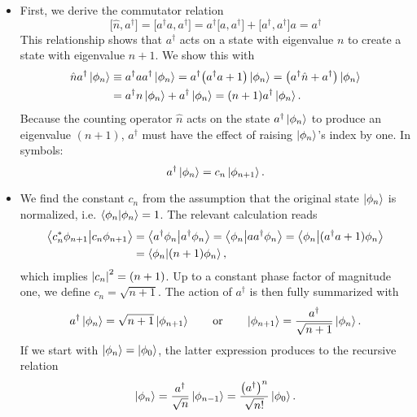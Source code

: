 \documentclass[11pt, a4paper]{article}
\newcommand{\eqtext}[1]{\qquad \text{#1} \qquad}
\newcommand{\bbraket}[2]{\big \langle {#1} \big | {#2} \big \rangle}  %
\renewcommand{\k}[1]{\ket{#1}}
\begin{document}
\begin{itemize}
	\item First, we derive the commutator relation
	\begin{equation*}
		\big[\hat{n}, a^{\dagger}\big] = \big[a^{\dagger} a, a^{\dagger}\big] = a^{\dagger}\big[a, a^{\dagger}\big] + \big[a^{\dagger}, a^{\dagger}\big]a = a^{\dagger}
	\end{equation*}
	This relationship shows that $ a^{\dagger} $ acts on a state with eigenvalue $ n $ to create a state with eigenvalue $ n + 1 $. We show this with
	\begin{align*}
		\hat{n}a^{\dagger}\k{\phi_{n}} &\equiv a^{\dagger} a a^{\dagger}\k{\phi_{n}} = a^{\dagger}\big(a^{\dagger}a + 1\big)\ket{\phi_{n}} = \big(a^{\dagger}\hat{n} + a^{\dagger}\big)\k{\phi_{n}}\\
		& = a^{\dagger}n \k{\phi_{n}} + a^{\dagger}\k{\phi_{n}} = (n + 1)a^{\dagger}\ket{\phi_{n}}.
	\end{align*}
	Because the counting operator $ \hat{n} $ acts on the state $ a^{\dagger}\ket{\phi_{n}} $ to produce an eigenvalue $ (n+1) $, $ a^{\dagger} $ must have the effect of raising $ \k{\phi_{n}} $'s index by one. In symbols:
	\begin{equation*}
		a^{\dagger} \k{\phi_{n}} = c_{n}\ket{\phi_{n + 1}}.
	\end{equation*}
	
	\item We find the constant $ c_{n} $ from the assumption that the original state $ \ket{\phi_{n}} $ is normalized, i.e. $ \braket{\phi_{n}}{\phi_{n}} = 1 $. The relevant calculation reads
	\begin{align*}
		\bbraket{c_{n}^{*}\phi_{n+1}}{c_{n}\phi_{n+1}} &= \bbraket{a^{\dagger}\phi_{n}}{a^{\dagger}\phi_{n}} = \bbraket{\phi_{n}}{aa^{\dagger}\phi_{n}} = \bbraket{\phi_{n}}{(a^{\dagger}a + 1)\phi_{n}} \\
		&= \braket{\phi_{n}}{(n + 1)\phi_{n}},
	\end{align*}
	which implies $ \abs{c_{n}}^{2} = (n+1) $. Up to a constant phase factor of magnitude one, we define $ c_{n} = \sqrt{n+1} $. The action of $ a^{\dagger} $ is then fully summarized with
	\begin{equation*}
        a^{\dagger} \k{\phi_{n}} = \sqrt{n+1}\ket{\phi_{n+1}} \eqtext{or} \ket{\phi_{n + 1}} = \frac{a^{\dagger}}{\sqrt{n+1}}\k{\phi_{n}}. 
	\end{equation*}
	If we start with $ \ket{\phi_{n}} = \ket{\phi_{0}} $, the latter expression produces to the recursive relation
	\begin{equation*}
		\ket{\phi_{n}} = \frac{a^{\dagger}}{\sqrt{n}}\ket{\phi_{n-1}} = \frac{\big(a^{\dagger}\big)^{n}}{\sqrt{n!}}\ket{\phi_{0}}.
	\end{equation*}
	

\end{itemize}
\end{document}
